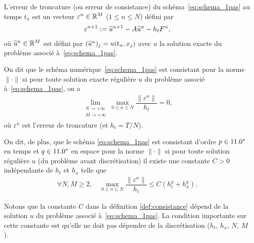 \documentclass[12pt,a4paper,twoside]{article}
\begin{document}
\begin{definition}
  \label{def:troncature}
  L'erreur de troncature (ou erreur de consistance) du sch\'ema~\eqref{eq:schema_1pas}
  au temps $t_n$ est un vecteur $\varepsilon^n \in \mathbb{R}^{M}$
  ($1 \leq n \leq N$)
  d\'efini par
  \begin{align}
    \label{eq:troncature}
    \varepsilon^{n+1} := \widetilde{u}^{n+1} - A \widetilde{u}^n - h_t F^n ,
  \end{align}
  o\`u $\widetilde{u}^n \in \mathbb{R}^{M}$ est d\'efini par
  $(\widetilde{u}^n)_j = u(t_n,x_j)$ avec $u$ la solution exacte du probl\`eme associ\'e \`a~\eqref{eq:schema_1pas}.
\end{definition}

\begin{definition}[Consistance]
  \label{def:consistance}
  On dit que le sch\'ema num\'erique~\eqref{eq:schema_1pas} est consistant pour la norme $\| \cdot \|$
  si pour toute solution exacte r\'eguli\`ere $u$ du probl\`eme associ\'e \`a~\eqref{eq:schema_1pas}, on a
  \begin{align}
    \lim_{\substack{N \to +\infty\\ M \to +\infty}} \max_{0\leq n \leq N} 
    \dfrac{\| \varepsilon^n \|}{h_t} = 0 ,
  \end{align}
  o\`u $\varepsilon^n$ est l'erreur de troncature (et $h_t = T/N$).

  On dit, de plus, que le sch\'ema \eqref{eq:schema_1pas} est consistant d'ordre $p \in 11.0^*$
  en temps et $q \in 11.0^*$ en espace pour la norme $\| \cdot \|$
  si pour toute solution r\'eguli\`ere $u$ (du probl\`eme avant discr\'etisation)
  il existe une constante $C>0$ ind\'ependante de $h_t$ et $h_x$ telle que
  \begin{align}
    \forall N, M \geq 2 , \quad \max_{0\leq n \leq N}
    \dfrac{\| \varepsilon^n \|}{h_t} \leq C (h_t^p + h_x^q) .
  \end{align}
\end{definition}

\begin{remark}
  Notons que la constante $C$ dans la d\'efinition \ref{def:consistance}
  d\'epend de la solution $u$ du probl\`eme associ\'e \`a~\eqref{eq:schema_1pas}.
  La condition importante sur cette constante est qu'elle ne doit pas d\'ependre de la discr\'etisation
  ($h_t$, $h_x$, $N$, $M$).
\end{remark}
\end{document}
